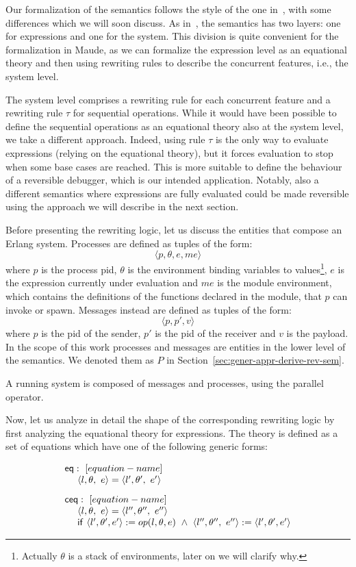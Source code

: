 \documentclass{article}[12pt,a4paper]
\theoremstyle{definition}
\begin{document}
Our formalization of the semantics follows the style of the one
in~\cite{Gonzalez-AbrilV21}, with some differences which we will soon discuss. As
in~\cite{Gonzalez-AbrilV21}, the semantics has two
layers: one for expressions and one for the system. This division is quite convenient for the formalization in Maude, as we
can formalize the expression level as an equational theory and then using rewriting
rules to describe the concurrent features, i.e., the system level.

The system level comprises a rewriting rule for each concurrent feature and a
rewriting rule $\tau$ for sequential operations. While it would have been
possible to
define the sequential operations as an equational theory also at the system level, we take a different approach. Indeed, using rule $\tau$ is the only way to evaluate expressions (relying on the equational theory), but it forces evaluation to stop when some base cases are reached. This is more suitable to define the behaviour of a reversible debugger, which is our intended application. Notably, also a different semantics where expressions are fully evaluated could be made reversible using the approach we will describe in the next section.

Before presenting the rewriting logic, let us
discuss the entities that compose an Erlang system.
Processes are defined as tuples of the form:
\[\langle p, \theta, e, me \rangle\]
where $p$ is the process pid, $\theta$ is the environment binding variables to
values\footnote{Actually $\theta$ is a stack of environments, later on we will clarify
  why. }, $e$ is the expression currently under evaluation and $me$ is the
module environment, which contains the definitions of the functions declared in the module, that $p$ can invoke or
spawn.
Messages instead are defined as tuples of the form:
\[\langle p, p', v \rangle\]
where $p$ is the pid of the sender, $p'$ is the pid of the receiver and $v$ is
the payload. In the scope of this work processes and messages are entities in the
lower level of the semantics. We denoted them as $P$ in Section~\ref{sec:gener-appr-derive-rev-sem}.

A running system is composed of messages and processes, using the
parallel operator.

Now, let us analyze in detail the shape of the corresponding rewriting logic by first analyzing the equational theory for expressions. The theory
is defined as a set of equations which have one of the following generic forms:

\[
  \begin{array}{l}
    \mathsf{eq}:~[equation-name]\\
    ~~~~\langle l,\theta,~e \rangle = \langle l',\theta',~e' \rangle\\[2ex]

    \mathsf{ceq}:~[equation-name]\\
    ~~~~\langle l,\theta,~e \rangle = \langle l'',\theta'',~e'' \rangle\\
    ~~~~\mathsf{if}~\langle l', \theta', e'\rangle :=op(l,\theta,e)~\wedge~\langle
    l'',\theta'',~e'' \rangle := \langle l',\theta',e'\rangle

  \end{array}
\]
\end{document}
